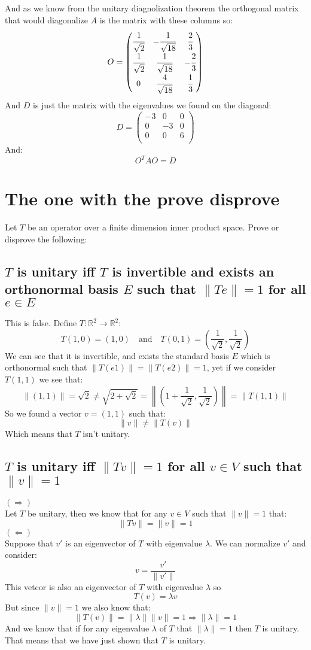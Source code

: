 \documentclass[11pt,a4paper]{article}
\theoremstyle{plain}
\newcommand{\R}{\mathbb{R}}
\begin{document}
	And as we know from the unitary diagnolization theorem the orthogonal
	matrix that would diagonalize $A$ is the matrix with these columns so:
	\[
		O = \begin{pmatrix}
		\cfrac{1}{\sqrt{2}} & -\cfrac{1}{\sqrt{18}} & \cfrac{2}{3} \\
		\cfrac{1}{\sqrt{2}} & \cfrac{1}{\sqrt{18}} & -\cfrac{2}{3} \\
		0 & \cfrac{4}{\sqrt{18}} & \cfrac{1}{3}
		\end{pmatrix}
	\]
	And $D$ is just the matrix with the eigenvalues we found on the diagonal:
	\[
		D = \begin{pmatrix}
			-3 & 0 & 0\\
			0 & -3 & 0\\
			0 & 0 & 6\\
			\end{pmatrix}
	\]
	And:
	\[
		O^TAO = D
	\]
	
	\newpage
	
	\section{The one with the prove disprove}
	Let $T$ be an operator over a finite dimension inner product space. 
	Prove or disprove the following:
	\subsection{$T$ is unitary iff $T$ is invertible and exists an orthonormal
	basis $E$ such that $\|Te\|=1$ for all $e\in E$}
	This is false. Define $T\colon \R^2 \to \R^2$:
	\[
		T(1,0) = (1,0) \quad\text{and}\quad 
		T(0,1) = \left(\frac{1}{\sqrt{2}},\frac{1}{\sqrt{2}}\right)
	\]
	We can see that it is invertible, and exists the standard basis $E$ 
	which is orthonormal such that $\|T(e1)\| = \|T(e2)\| = 1$, yet if we 
	consider $T(1,1)$ we see that:
	\[
		\|(1,1)\| = \sqrt{2} \neq 
		\sqrt{2 + \sqrt{2}} = 
		\left\|\left(1+\frac{1}{\sqrt{2}},\frac{1}{\sqrt{2}}\right)\right\| = 
		\|T(1,1)\|
	\]
	So we found a vector $v = (1,1)$ such that:
	\[
		\|v\| \neq \|T(v)\|
	\]
	Which means that $T$ isn't unitary.
	
	
	\newpage
	
	\subsection{$T$ is unitary iff $\|Tv\|=1$ for all $v\in V$ such that 
	$\|v\|=1$}
	$(\Rightarrow)$ \\
	Let $T$ be unitary, then we know that for any $v\in V$ such that $\|v\| = 1$
	that:
	\[
		\|Tv\| = \|v\| = 1
	\]
	$(\Leftarrow)$ \\
	Suppose that $v'$ is an eigenvector of $T$ with eigenvalue $\lambda$.
	We can normalize $v'$ and consider:
	\[
		v = \frac{v'}{\|v'\|}
	\]
	This vetcor is also an eigenvector of $T$ with eigenvalue $\lambda$ so
	\[
		T(v) = \lambda v
	\]
	But since $\|v\| = 1$ we also know that:
	\[
		\|T(v)\| = \|\lambda\| \|v\| = 1 \Rightarrow \|\lambda\| = 1
	\]
	And we know that if for any eigenvalue $\lambda$ of $T$ that 
	$\|\lambda\|=1$  then $T$ is unitary. That means that we have just shown
	that $T$ is unitary.
	
\end{document}
